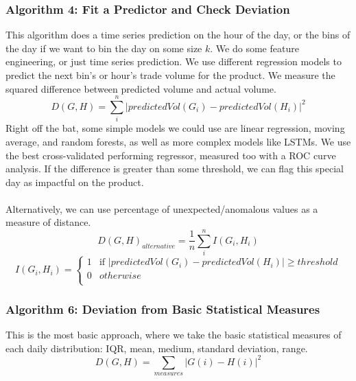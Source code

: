 \documentclass[11pt]{article}
\begin{document}
\subsubsection*{Algorithm 4: Fit a Predictor and Check Deviation}
This algorithm does a time series prediction on the hour of the day, or the bins of the day if we want to bin the day on some size $k$. We do some feature engineering, or just time series prediction. We use different regression models to predict the next bin's or hour's trade volume for the product. We measure the squared difference between predicted volume and actual volume.
$$D(G,H) = \sum_i^n |predictedVol(G_i)-predictedVol(H_i)|^2$$
Right off the bat, some simple models we could use are linear regression, moving average, and random forests, as well as more complex models like LSTMs. We use the best cross-validated performing regressor, measured too with a ROC curve analysis. If the difference is greater than some threshold, we can flag this special day as impactful on the product. 
\\\\Alternatively, we can use percentage of unexpected/anomalous values as a measure of distance.
$$D(G,H)_{alternative} = \frac{1}{n}\sum_i^n I(G_i, H_i)$$
\[ I(G_i, H_i) =  \left\{ 
\begin{array}{ll}
      1 & \text{if }|predictedVol(G_i)-predictedVol(H_i)| \geq threshold \\
      0 & otherwise  \\
      \end{array} 
\right. \]

\subsubsection*{Algorithm 6: Deviation from Basic Statistical Measures}
This is the most basic approach, where we take the basic statistical measures of each daily distribution: IQR, mean, medium, standard deviation, range.
$$D(G,H) = \sum_{measures} |G(i) - H(i)|^2$$
\end{document}
